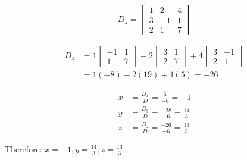 \[
	D_z = \begin{vmatrix}
		1 & 2 & 4 \\
		3 & -1 & 1 \\
		2 & 1 & 7
	\end{vmatrix}
\]

\begin{align*}
	D_z &= 1\begin{vmatrix}
		-1 & 1 \\
		1 & 7
	\end{vmatrix} - 2\begin{vmatrix}
		3 & 1 \\
		2 & 7
	\end{vmatrix} + 4\begin{vmatrix}
		3 & -1 \\
		2 & 1
	\end{vmatrix} \\
	&= 1(-8) - 2(19) + 4(5) = -26
\end{align*}

\begin{align*}
	x &= \frac{D_x}{D} = \frac{6}{-6} = -1 \\
	y &= \frac{D_y}{D} = \frac{-28}{-6} = \frac{14}{3} \\
	z &= \frac{D_z}{D} = \frac{-26}{-6} = \frac{13}{3}
\end{align*}

Therefore: $x = -1, y = \frac{14}{3}, z = \frac{13}{3}$

